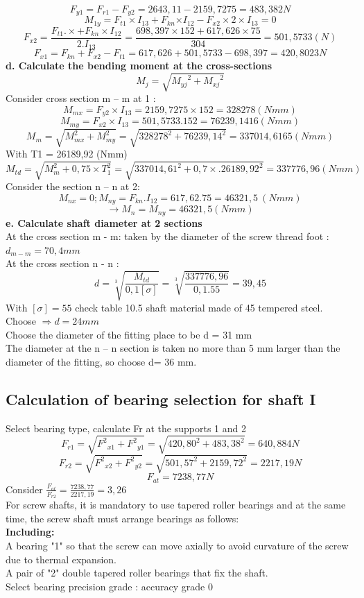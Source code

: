 $$F_{y1}=F_{r1}-F_{y2}=2643,11-2159,7275=483,382N$$
$$M_{1y}=F_{t1}\times I_{13}+F_{kn}{\times I}_{12}-F_{x2}\times2\times I_{13}=0$$
$$F_{x2}=\frac{F_{t1}.\times+F_{kn}\times I_{12}}{2.I_{13}}=\frac{698,397\times152+617,626\times75}{304}=501,5733(N)$$
$$F_{x1}=F_{kn}+F_{x2}-F_{t1}=617,626 + 501,5733 -698,397=420,8023 N$$
\textbf{d.	Calculate the bending moment at the cross-sections}
$$	M_j=\sqrt{{M_{yj}}^2+{M_{xj}}^2}$$
Consider cross section m – m at 1 :\\
$$M_{mx}=F_{y2}\times I_{13}= 2159,7275\times152=328278(Nmm)$$
$$M_{my}=F_{x2}\times I_{13}=501,5733.152=76239,1416\left(Nmm\right)$$
$$M_m=\sqrt{M_{mx}^2+M_{my}^2}=\sqrt{{328278}^2+{76239,14}^2}=337014,6165\left(Nmm\right)$$
With T1 = 26189,92 (Nmm)
$$M_{td}=\sqrt{M_m^2+0,75\times T_1^2}=\sqrt{{337014,61}^2+{0,7\times.26189,92}^2}=337776,96\left(Nmm\right)$$
Consider the section n – n at 2:
$$M_{nx}=0;M_{ny}=F_{kn}.I_{12}=617,62.75=46321,5\ (Nmm)$$
$$\rightarrow M_n=M_{ny}=46321,5 (Nmm)$$
\textbf{e.	 Calculate shaft diameter at 2 sections}\\
At the cross section m - m: taken by the diameter of the screw thread foot :\\
$d_{m-m} = 70,4 mm$\\
At the cross section n - n :
$$d=\sqrt[3]{\frac{M_{td}}{0,1\left[\sigma\right]}}=\sqrt[3]{\frac{337776,96}{0,1.55}}=39,45$$
With $[\sigma]=55$ check table 10.5 shaft material made of 45 tempered steel.\\
 Choose $\Rightarrow d = 24 mm$\\
	 Choose the diameter of the fitting place to be d = 31 mm\\
	The diameter at the n – n section is taken no more than 5 mm larger than the diameter of the fitting, so choose d= 36 mm.\\
\subsection{Calculation of bearing selection for shaft I}
Select bearing type, calculate Fr at the supports 1 and 2
$$F_{r1}=\sqrt{{F^2}_{x1}+{F^2}_{y1}}=\sqrt{{420,80}^2+{483,38}^2}=640,884N$$
$$F_{r2}=\sqrt{{F^2}_{x2}+{F^2}_{y2}}=\sqrt{{501,57}^2+{2159,72}^2}=2217,19N$$
$$F_{at}=7238,77N$$
Consider $ \frac{F_{at}}{F_{r2}}=\frac{7238,77}{2217,19}=3,26$\\
For screw shafts, it is mandatory to use tapered roller bearings and at the same time, the screw shaft must arrange bearings as follows:\\%
\textbf{Including:}\\
A bearing "1" so that the screw can move axially to avoid curvature of the screw due to thermal expansion.\\
A pair of "2" double tapered roller bearings that fix the shaft.\\
	Select bearing precision grade : accuracy grade 0\\
